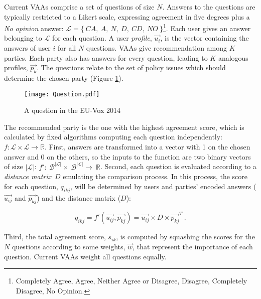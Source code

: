 \documentclass{scrartcl}
\begin{document}
Current VAAs comprise a set of questions of size $N$. Answers to the questions are typically restricted to a Likert scale, expressing agreement in five degrees plus a \textit{No opinion} answer: $\mathcal{L} = \lbrace\: CA,\: A,\: N,\: D,\: CD,\: NO\:\rbrace$\footnote{Completely Agree, Agree, Neither Agree or Disagree, Disagree, Completely Disagree, No Opinion.}.
Each user gives an answer belonging to $\mathcal{L}$ for each question. A user \textit{profile}, $\Vec{u_i}$, is the vector containing the answers of user $i$ for all $N$ questions.
VAAs give recommendation among $K$ parties. Each party also has answers for every question, leading to $K$ analogous profiles, $\Vec{p_k}$.
The questions relate to the set of policy issues which should determine the chosen party (Figure \ref{fig:question}). 

\pagebreak

\begin{figure} [!h]
    \centering
    \centerline{\texttt{[image: Question.pdf]}}
    \caption{A question in the EU-Vox 2014 \cite{agathokleous2016applying}}
    \label{fig:question}
\end{figure}

The recommended party is the one with the highest agreement score, which is calculated by fixed algorithms computing each question independently: $f: \mathcal{L} \times \mathcal{L} \longrightarrow \mathbb{R}$. First, answers are transformed into a vector with 1 on the chosen answer and 0 on the others, so the inputs to the function are two binary vectors of size $|\mathcal{L}|$: $f':~\mathcal{B}^{|\mathcal{L}|} \times~\mathcal{B}^{|\mathcal{L}|} \longrightarrow~\mathbb{R}$. Second, each question is evaluated according to a \textit{distance matrix}~$D$ emulating the comparison process. In this process, the score for each question, $q_{ikj}$, will be determined by users and parties' encoded answers ($\Vec{u_{ij}}$ and $\Vec{p_{kj}}$) and the distance matrix ($D$):  

\begin{equation}
    q_{ikj} = f'( \Vec{u_{ij}}, \Vec{p_{kj}} ) = \Vec{u_{ij}} \times D \times \Vec{p_{kj}}^T \: .
    \label{eq:question_score}
\end{equation}

Third, the total agreement score, $s_{ik}$, is computed by squashing the scores for the $N$ questions according to some weights, $\Vec{w}$, that represent the importance of each question. Current VAAs weight all questions equally. 
\end{document}
